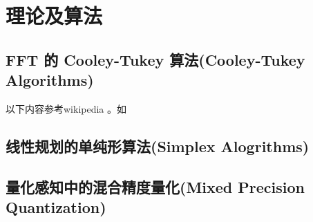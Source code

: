 \section{理论及算法}

\subsection{FFT 的 Cooley-Tukey 算法(Cooley-Tukey Algorithms)}

以下内容参考wikipedia 。如

\subsection{线性规划的单纯形算法(Simplex Alogrithms)}


\subsection{量化感知中的混合精度量化(Mixed Precision Quantization)}


